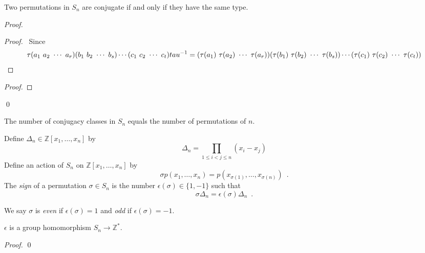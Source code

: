 \begin{prop}
Two permutations in $S_n$ are conjugate if and only if they have the same type.
\end{prop}

\begin{proof}
\pf
{}
\begin{proof}
	\pf\ Since
	\[ \tau (a_1\ a_2\ \cdots\ a_r) (b_1\ b_2\ \cdots\ b_s) \cdots (c_1\ c_2\ \cdots\ c_t) \inv{tau} = (\tau(a_1)\ \tau(a_2)\ \cdots\ \tau(a_r)) (\tau(b_1)\ \tau(b_2)\ \cdots\ \tau(b_s)) \cdots (\tau(c_1)\ \tau(c_2)\ \cdots\ \tau(c_t)) \]
\end{proof}
\begin{proof}
\end{proof}
\qed
\end{proof}

\begin{cor}
The number of conjugacy classes in $S_n$ equals the number of permutations of $n$.
\end{cor}

\begin{df}[Sign]
Define $\Delta_n \in \mathbb{Z}[x_1, \ldots, x_n]$ by
\[ \Delta_n = \prod_{1 \leq i < j \leq n} (x_i - x_j) \]
Define an action of $S_n$ on $\mathbb{Z}[x_1, \ldots, x_n]$ by
\[ \sigma p(x_1, \ldots, x_n) = p(x_{\sigma(1)}, \ldots, x_{\sigma(n)}) \enspace . \]
The \emph{sign} of a permutation $\sigma \in S_n$ is the number $\epsilon(\sigma) \in \{ 1, -1 \}$ such that
\[ \sigma \Delta_n = \epsilon(\sigma) \Delta_n \enspace. \]

We say $\sigma$ is \emph{even} if $\epsilon(\sigma) = 1$ and \emph{odd} if $\epsilon(\sigma) = -1$.
\end{df}

\begin{prop}
$\epsilon$ is a group homomorphism $S_n \rightarrow \mathbb{Z}^*$.
\end{prop}

\begin{proof}
\pf
{}
\qed
\end{proof}

